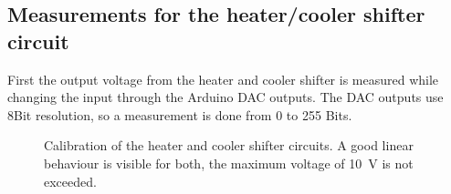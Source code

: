 \documentclass[12pt]{scrartcl}
\begin{document}
      \subsection{Measurements for the heater/cooler shifter circuit}
        First the output voltage from the heater and cooler shifter is measured while
        changing the input through the Arduino DAC outputs. The DAC outputs use
        8Bit resolution, so a measurement is done from 0 to 255 Bits.
        \begin{figure}[h]
          \caption{Calibration of the heater and cooler shifter circuits. A good
          linear behaviour is visible for both, the maximum voltage of 10~V is
          not exceeded.}
          \label{fig8}
        \end{figure}
\end{document}
